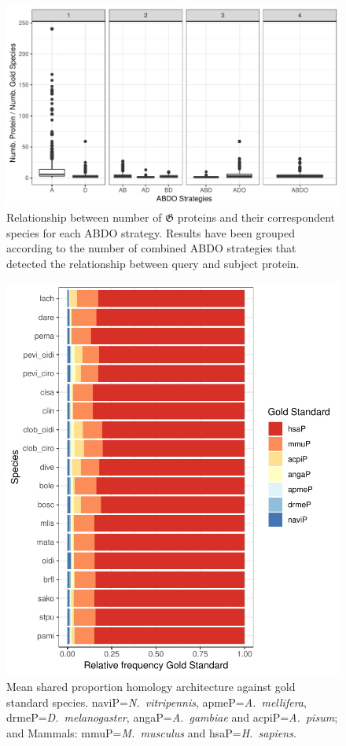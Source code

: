 \documentclass[11pt]{article}
\begin{document}
\begin{figure}[ht!]
	\centering
	\includegraphics[scale=0.7]{figures/relationGoldenABDO}
	\caption{Relationship between number of $\boldsymbol{\mathfrak{G}}$ proteins and
	their correspondent species for each ABDO strategy. Results have been grouped
	according to the number of combined ABDO strategies that detected the relationship
	between query and subject protein.}\label{fig:relation}
\end{figure}

\begin{figure}[ht!]
  \centering
  \includegraphics[scale=0.7]{figures/proportionsGOLD}
  \caption{Mean shared proportion homology architecture against 
    gold standard species. \textsf{naviP=}\textit{N.\ vitripennis}, 
    \textsf{apmeP=}\textit{A.\ mellifera}, \textsf{drmeP=}\textit{D.\ melanogaster}, 
    \textsf{angaP=}\textit{A.\ gambiae} and \textsf{acpiP=}\textit{A.\ pisum}; 
    and Mammals: \textsf{mmuP=}\textit{M.\ musculus} and 
  \textsf{hsaP=}\textit{H.\ sapiens}.}\label{fig:FrecEstrat}
\end{figure}
\end{document}
